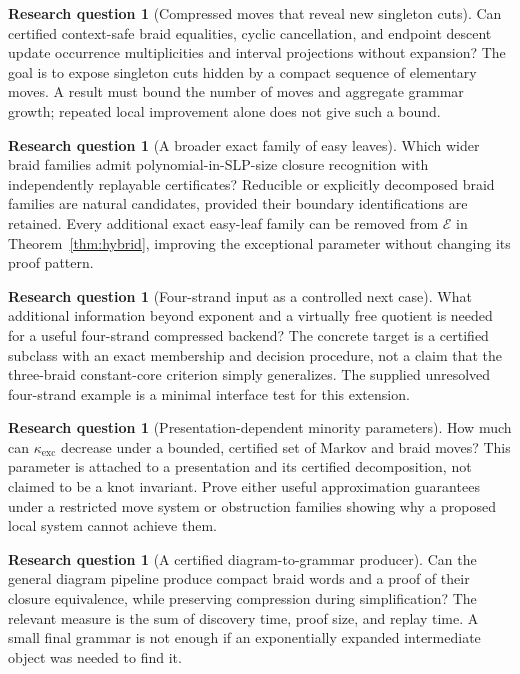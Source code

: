 \documentclass[11pt,letterpaper]{article}
\theoremstyle{definition}\newtheorem{definition}[theorem]{Definition}
\newtheorem{question}[theorem]{Research question}
\theoremstyle{remark}\newtheorem{remark}[theorem]{Remark}
\newcommand{\exc}{\mathrm{exc}}
\begin{document}
\begin{question}[Compressed moves that reveal new singleton cuts]
Can certified context-safe braid equalities, cyclic cancellation, and endpoint descent update occurrence multiplicities and interval projections without expansion? The goal is to expose singleton cuts hidden by a compact sequence of elementary moves. A result must bound the number of moves and aggregate grammar growth; repeated local improvement alone does not give such a bound.
\end{question}

\begin{question}[A broader exact family of easy leaves]
Which wider braid families admit polynomial-in-SLP-size closure recognition with independently replayable certificates? Reducible or explicitly decomposed braid families are natural candidates, provided their boundary identifications are retained. Every additional exact easy-leaf family can be removed from $\mathcal E$ in Theorem~\ref{thm:hybrid}, improving the exceptional parameter without changing its proof pattern.
\end{question}

\begin{question}[Four-strand input as a controlled next case]
What additional information beyond exponent and a virtually free quotient is needed for a useful four-strand compressed backend? The concrete target is a certified subclass with an exact membership and decision procedure, not a claim that the three-braid constant-core criterion simply generalizes. The supplied unresolved four-strand example is a minimal interface test for this extension.
\end{question}

\begin{question}[Presentation-dependent minority parameters]
How much can $\kappa_{\exc}$ decrease under a bounded, certified set of Markov and braid moves? This parameter is attached to a presentation and its certified decomposition, not claimed to be a knot invariant. Prove either useful approximation guarantees under a restricted move system or obstruction families showing why a proposed local system cannot achieve them.
\end{question}

\begin{question}[A certified diagram-to-grammar producer]
Can the general diagram pipeline produce compact braid words and a proof of their closure equivalence, while preserving compression during simplification? The relevant measure is the sum of discovery time, proof size, and replay time. A small final grammar is not enough if an exponentially expanded intermediate object was needed to find it.
\end{question}
\end{document}
